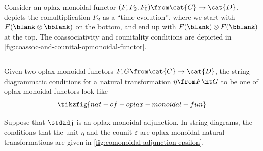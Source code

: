 \begin{example}\label{ex:graphical-opmonoidal-functor}
  Consider an oplax monoidal functor \((F, F_2, F_0) \from \cat{C} \to \cat{D}\).
   depicts the comultiplication \(F_2\) as a ``time evolution'',
  where we start with \(F(\blank \otimes \bblank)\) on the bottom,
  and end up with \(F(\blank) \otimes F(\bblank)\) at the top.
  The coassociativity and counitality conditions are depicted in \cref{fig:coassoc-and-counital-opmonoidal-functor}.
  \begin{figure}[htbp]
    \centering
    \vspace{\onelineskip}\hrule
  \end{figure}
  \begin{figure}[htbp]
    \centering
    \vspace{-\onelineskip}
  \end{figure}
\end{example}

\newpage%
\begin{remark}
  Given two oplax monoidal functors \(F,G\from \cat{C} \to \cat{D}\),
  the string diagrammatic conditions for a natural transformation \(\eta\from F \nt G\) to be one of oplax monoidal functors
  look like
  \[
    \tikzfig{nat-of-oplax-monoidal-fun}
  \]
\end{remark}

\begin{example}\label{ex:graphical-opmonoidal-adjunctions}
  Suppose that \(\stdadj\) is an oplax monoidal adjunction.
  In string diagrams, the conditions that the unit \(\eta\) and the counit \(\varepsilon\)
  are oplax monoidal natural transformations are
  given in \cref{fig:comonoidal-adjunction-epsilon}.
  \begin{figure}[htbp]
    \centering
    \vspace{-0.2cm}%
  \end{figure}
\end{example}

